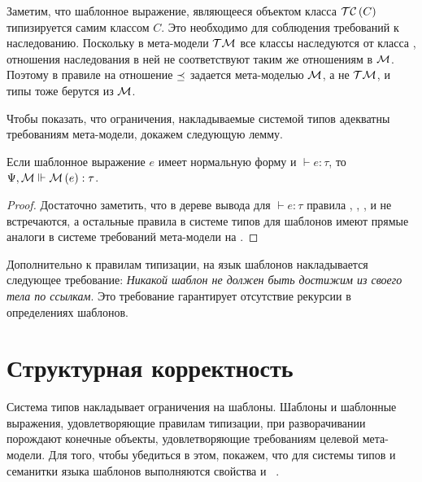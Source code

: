 Заметим, что шаблонное выражение, являющееся объектом класса $\mathcal{TC}\left(C\right)$ типизируется самим классом $C$. Это необходимо для соблюдения требований к наследованию. Поскольку в мета-модели $\mathcal{TM}$ все классы наследуются от класса , отношения наследования в ней не соответствуют таким же отношениям в $\mathcal{M}$. Поэтому в правиле  на  отношение $\preceq$ задается мета-моделью $\mathcal{M}$, а не $\mathcal{TM}$, и типы тоже берутся из $\mathcal{M}$. 

Чтобы показать, что ограничения, накладываемые системой типов адекватны требованиям мета-модели, докажем следующую лемму.
\begin{Lemm}\label{LemmNF}
Если шаблонное выражение $e$ имеет нормальную форму и $\vdash e : \tau$, то $\Psi, \mathcal{M} \Vdash \mathcal{M}\left(e\right) : \tau$.
\end{Lemm}
\begin{proof}
Достаточно заметить, что в дереве вывода для $\vdash e : \tau$ правила , , ,  и  не встречаются, а остальные правила в системе типов для шаблонов имеют прямые аналоги в системе требований мета-модели на .
\end{proof}

Дополнительно к правилам типизации, на язык шаблонов накладывается следующее требование: 
\emph{Никакой шаблон не должен быть достижим из своего тела по ссылкам}. Это требование гарантирует отсутствие рекурсии в определениях шаблонов.

\section{Структурная корректность}

Система типов накладывает ограничения на шаблоны. Шаблоны и шаблонные выражения, удовлетворяющие правилам типизации, при разворачивании порождают конечные объекты, удовлетворяющие требованиям целевой мета-модели.
Для того, чтобы убедиться в этом, покажем, что для системы типов и семанитки языка шаблонов выполняются свойства  и ~\cite{Pierce}. 

